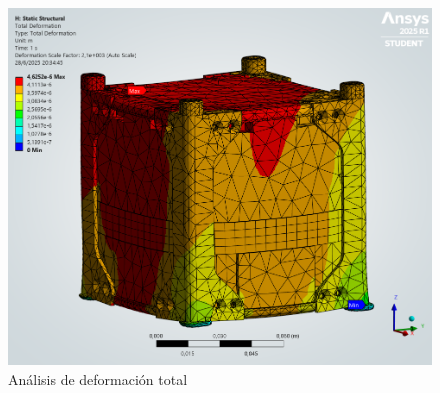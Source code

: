   \begin{figure}[H]
    \centering
    \includegraphics[width=14cm]{image/fem/ansys_cubesat-static_deformation.png}
    \caption{Análisis de deformación total}
    \label{fig:fem_static_deformation}
  \end{figure}

